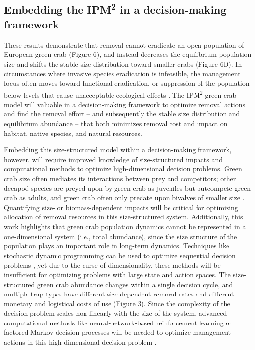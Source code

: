 \documentclass{article}
\begin{document}
\subsection{Embedding the IPM\textsuperscript{2} in a decision-making framework}

These results demonstrate that removal cannot eradicate an open population of European green crab (Figure 6), and instead decreases the equilibrium population size and shifts the stable size distribution toward smaller crabs (Figure 6D). In circumstances where invasive species eradication is infeasible, the management focus often moves toward functional eradication, or suppression of the population below levels that cause unacceptable ecological effects \parencite{green2021functional}. The IPM\textsuperscript{2} green crab model will valuable in a decision-making framework to optimize removal actions and find the removal effort – and subsequently the stable size distribution and equilibrium abundance – that both minimizes removal cost and impact on habitat, native species, and natural resources. 

Embedding this size-structured model within a decision-making framework, however, will require improved knowledge of size-structured impacts and computational methods to optimize high-dimensional decision problems. Green crab size often mediates its interactions between prey and competitors; other decapod species are preyed upon by green crab as juveniles but outcompete green crab as adults, and green crab often only predate upon bivalves of smaller size \parencite{grosholz2005recent, williams2009competition, mcdonald2001competitive, curtis2012prey}. Quantifying size- or biomass-dependent impacts will be critical for optimizing allocation of removal resources in this size-structured system. Additionally, this work highlights that green crab population dynamics cannot be represented in a one-dimensional system (i.e., total abundance), since the size structure of the population plays an important role in long-term dynamics. Techniques like stochastic dynamic programming can be used to optimize sequential decision problems \parencite{marescot2013complex}, yet due to the curse of dimensionality, these methods will be insufficient for optimizing problems with large state and action spaces. The size-structured green crab abundance changes within a single decision cycle, and multiple trap types have different size-dependent removal rates and different monetary and logistical costs of use (Figure 3). Since the complexity of the decision problem scales non-linearly with the size of the system, advanced computational methods like neural-network-based reinforcement learning or factored Markov decision processes will be needed to optimize management actions in this high-dimensional decision problem \parencite{lapeyrolerie2022deep, nicol2015adapting}. 
\end{document}
